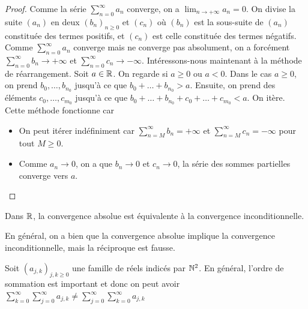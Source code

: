 \begin{proof}
    Comme la série $\sum_{n=0}^\infty a_n$ converge, on a $\lim_{n\to+\infty}a_n = 0$. On divise la suite $(a_n)$ en deux $(b_n)_{n\ge 0}$ et $(c_n)$ où $(b_n)$ est la sous-suite de $(a_n)$ constituée des termes positifs, et $(c_n)$ est celle constituée des termes négatifs. Comme $\sum_{n=0}^\infty a_n$ converge mais ne converge pas absolument, on a forcément $\sum_{n=0}^\infty b_n\to+\infty$ et $\sum_{n=0}^\infty c_n\to -\infty$. Intéressons-nous maintenant à la méthode de réarrangement. Soit $a\in\mathbb{R}$.  On regarde si $a\ge 0$ ou $a<0$. Dans le cas $a\ge 0$, on prend $b_0,\dotsc, b_{n_0}$ jusqu'à ce que $b_0 + \dots + b_{n_0} > a$. Ensuite, on prend des éléments $c_0,\dotsc, c_{m_0}$ jusqu'à ce que $b_0+ \dots + b_{n_0} + c_0 + \dots + c_{m_0}<a$. On itère. Cette méthode fonctionne car \begin{itemize}
        \item On peut itérer indéfiniment car $\sum_{n=M}^\infty b_n = +\infty$ et $\sum_{n=M}^\infty c_n = -\infty$ pour tout $M\ge 0$.
        \item Comme $a_n\to 0$, on a que $b_n\to 0$ et $c_n\to 0$, la série des sommes partielles converge vers $a$.
    \end{itemize}
\end{proof}
\begin{corollaire}
    Dans $\mathbb{R}$, la convergence absolue est équivalente à la convergence inconditionnelle.
\end{corollaire}
 \begin{remarque}
     En général, on a bien que la convergence absolue implique la convergence inconditionnelle, mais la réciproque est fausse.
 \end{remarque}
\begin{remarque}
    Soit $(a_{j,k})_{j,k\ge0}$ une famille de réels indicés par $\mathbb{N}^2$. En général, l'ordre de sommation est important et donc on peut avoir $\sum_{k=0}^\infty\sum_{j=0}^\infty a_{j,k}\ne \sum_{j=0}^\infty\sum_{k=0}^\infty a_{j,k}$
\end{remarque}